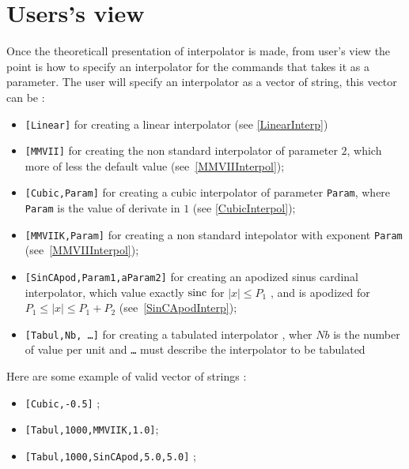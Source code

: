 
\section{Users's view}

\label{InterpUserView}

Once the theoreticall presentation of interpolator is made, from user's view the point is
how to specify an interpolator for the commands that takes it as a parameter.
The user will specify an interpolator as a  vector of string, this vector can be :

\begin{itemize}
    \item {\tt [Linear]}  for creating a linear interpolator (see \ref{LinearInterp})
    \item {\tt [MMVII]}  for creating the non standard interpolator of parameter $2$, which more of less the default value 
                         (see~\ref{MMVIIInterpol});
    \item {\tt [Cubic,Param]} for creating a cubic interpolator of parameter {\tt Param}, where {\tt Param} is the value
          of derivate in $1$ (see  \ref{CubicInterpol});
    \item {\tt [MMVIIK,Param]} for creating a non standard intepolator with exponent {\tt Param} 
                         (see~\ref{MMVIIInterpol});
    \item {\tt [SinCApod,Param1,aParam2]}  for creating an apodized sinus cardinal interpolator, which value exactly
         $\operatorname{sinc}$ for    $ |x| \leq P_1$  , and is apodized for   $ P_1\leq |x| \leq P_1+P_2$
                         (see~\ref{SinCApodInterp});
    \item {\tt [Tabul,Nb, \dots ]} for creating a tabulated interpolator , wher  $Nb$ is the number of value per unit  
          and {\tt \dots} must describe the interpolator to be tabulated
\end{itemize}

Here are some example of valid vector of strings :

\begin{itemize}
    \item   {\tt [Cubic,-0.5]} ;
    \item   {\tt [Tabul,1000,MMVIIK,1.0]};
    \item   {\tt [Tabul,1000,SinCApod,5.0,5.0]} ;
\end{itemize}

